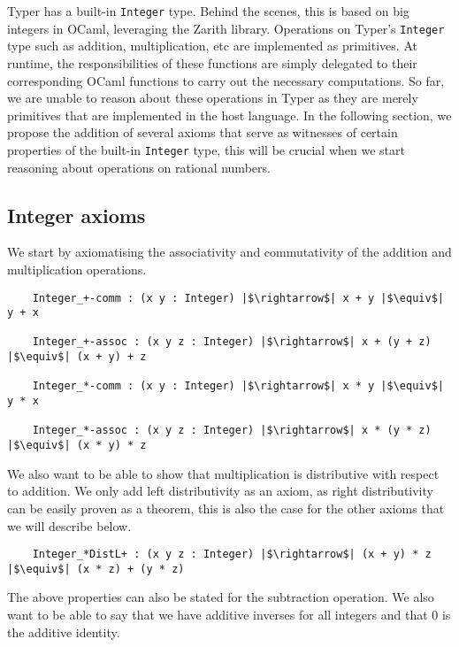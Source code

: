 \documentclass[12pt,twoside,maitrise]{dms}
\theoremstyle{definition}
\numberwithin{equation}{section}
\numberwithin{table}{chapter}
\numberwithin{figure}{chapter}
\newcommand\id[1] {\texttt{#1}}
\begin{document}
Typer has a built-in \id{Integer} type. Behind the scenes, this is based on big
integers in OCaml, leveraging the Zarith library. Operations on Typer's
\id{Integer} type such as addition, multiplication, etc are implemented as
primitives. At runtime, the responsibilities of these functions are simply
delegated to their corresponding OCaml functions to carry out the necessary
computations. So far, we are unable to reason about these operations in Typer as
they are merely primitives that are implemented in the host language. In the
following section, we propose the addition of several axioms that serve as
witnesses of certain properties of the built-in \id{Integer} type, this will be
crucial when we start reasoning about operations on rational numbers.

\subsection*{Integer axioms}
We start by axiomatising the associativity and commutativity of the addition and multiplication operations.

\begin{verbatim}
    Integer_+-comm : (x y : Integer) |$\rightarrow$| x + y |$\equiv$| y + x

    Integer_+-assoc : (x y z : Integer) |$\rightarrow$| x + (y + z) |$\equiv$| (x + y) + z

    Integer_*-comm : (x y : Integer) |$\rightarrow$| x * y |$\equiv$| y * x

    Integer_*-assoc : (x y z : Integer) |$\rightarrow$| x * (y * z) |$\equiv$| (x * y) * z
\end{verbatim}

We also want to be able to show that multiplication is distributive with respect
to addition. We only add left distributivity as an axiom, as right
distributivity can be easily proven as a theorem, this is also the case for the
other axioms that we will describe below.

\begin{verbatim}
    Integer_*DistL+ : (x y z : Integer) |$\rightarrow$| (x + y) * z |$\equiv$| (x * z) + (y * z)
\end{verbatim}

The above properties can also be stated for the subtraction operation. We also
want to be able to say that we have additive inverses for all integers and that
0 is the additive identity.
\end{document}
